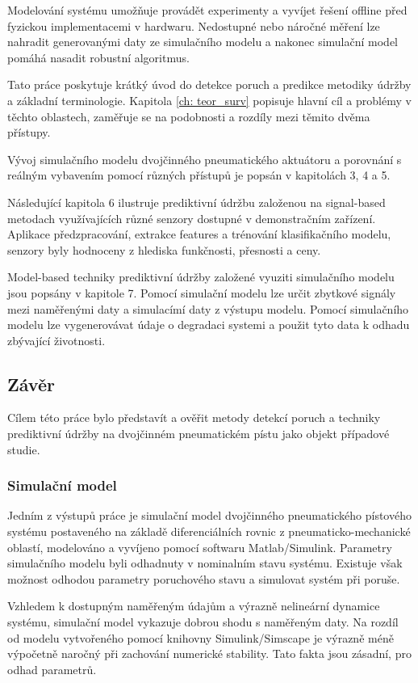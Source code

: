 Modelování systému umožňuje provádět experimenty a vyvíjet řešení
offline před fyzickou implementacemi v hardwaru. Nedostupné nebo
náročné  měření lze nahradit generovanými daty
ze simulačního modelu a nakonec simulační model pomáhá nasadit robustní
algoritmus.

Tato práce poskytuje krátký úvod do detekce poruch a predikce
metodiky údržby a základní terminologie.
Kapitola \ref{ch: teor_surv} popisuje hlavní cíl a problémy
v těchto oblastech, zaměřuje se na podobnosti a rozdíly mezi těmito 
dvěma přístupy.

Vývoj simulačního modelu dvojčinného pneumatického aktuátoru a
porovnání s reálným vybavením pomocí různých přístupů je
popsán v kapitolách 3, 4 a 5.

Následující kapitola 6 ilustruje prediktivní údržbu založenou na
signal-based
metodach využívajících různé senzory dostupné v demonstračním zařízení.
Aplikace předzpracování, extrakce features a trénování klasifikačního
modelu,
senzory byly hodnoceny z hlediska funkčnosti, přesnosti a ceny.

Model-based techniky prediktivní údržby založené vyuziti simulačního modelu
jsou popsány v kapitole 7. Pomocí simulační modelu lze
určit zbytkové signály mezi naměřenými daty a simulacímí daty z 
výstupu modelu. Pomocí simulačního modelu lze vygenerovávat údaje o degradaci
systemi a použit tyto data k odhadu zbývající životnosti.

\subsection*{Závěr}
Cílem této práce bylo představít a ověřit metody detekcí poruch a
techniky prediktivní údržby na dvojčinném pneumatickém pístu
jako objekt případové studie.

\subsubsection*{Simulační model}

Jedním z výstupů práce je simulační model
dvojčinného pneumatického pístového systému postaveného na základě diferenciálních rovnic
z pneumaticko-mechanické oblastí, modelováno a vyvíjeno pomocí
softwaru Matlab/Simulink. Parametry simulačního modelu byli odhadnuty v
nominalním stavu systému. Existuje však možnost
odhodou parametry poruchového stavu a simulovat systém při poruše.

Vzhledem k dostupným naměřeným údajům a výrazně nelineární dynamice
systému, simulační model vykazuje dobrou shodu s naměřeným
daty. Na rozdíl od modelu vytvořeného pomocí knihovny Simulink/Simscape je
výrazně méně výpočetně naročný při zachování numerické
stability. Tato fakta jsou zásadní, pro odhad parametrů.

